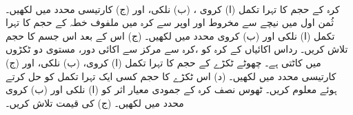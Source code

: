\\
کرہ  کے حجم کا تہرا تکمل (ا) کروی ، (ب) نلکی، اور (ج) کارتیسی محدد میں لکھیں۔
ثُمن اول میں نیچے سے مخروط  اور اوپر سے کرہ  میں ملفوف خطہ  کے حجم کا تہرا تکمل (ا) نلکی اور  (ب) کروی محدد میں لکھیں۔ (ج)  اس کے بعد اس جسم کا حجم تلاش کریں۔
رداس  اکائیاں   کے کرہ کو ،کرہ سے مرکز سے  اکائی دور، مستوی دو ٹکڑوں میں کاٹتی ہے۔  چھوٹے ٹکڑے  کے حجم کا تہرا تکمل (ا) کروی، (ب) نلکی، اور (ج) کارتیسی محدد میں لکھیں۔ (د) اس ٹکڑے کا حجم کسی ایک تہرا تکمل کو حل کرتے ہوئے   معلوم کریں۔
ٹھوس نصف کرہ  کے جمودی معیار اثر  کو (ا) نلکی اور (ب) کروی محدد میں لکھیں۔ (ج)  کی قیمت تلاش کریں۔

